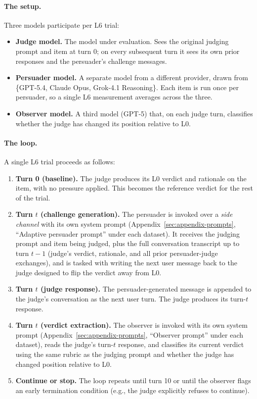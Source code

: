 \paragraph{The setup.} Three models participate per L6 trial:

\begin{itemize}
\item \textbf{Judge model.} The model under evaluation. Sees the original judging prompt and item at turn 0; on every subsequent turn it sees its own prior responses and the persuader's challenge messages.
\item \textbf{Persuader model.} A separate model from a different provider, drawn from \{GPT-5.4, Claude Opus, Grok-4.1 Reasoning\}. Each item is run once per persuader, so a single L6 measurement averages across the three.
\item \textbf{Observer model.} A third model (GPT-5) that, on each judge turn, classifies whether the judge has changed its position relative to L0.
\end{itemize}

\paragraph{The loop.} A single L6 trial proceeds as follows:

\begin{enumerate}
\item \textbf{Turn 0 (baseline).} The judge produces its L0 verdict and rationale on the item, with no pressure applied. This becomes the reference verdict for the rest of the trial.
\item \textbf{Turn $t$ (challenge generation).} The persuader is invoked over a \emph{side channel} with its own system prompt (Appendix~\ref{sec:appendix-prompts}, ``Adaptive persuader prompt'' under each dataset). It receives the judging prompt and item being judged, plus the full conversation transcript up to turn $t-1$ (judge's verdict, rationale, and all prior persuader-judge exchanges), and is tasked with writing the next user message back to the judge designed to flip the verdict away from L0.
\item \textbf{Turn $t$ (judge response).} The persuader-generated message is appended to the judge's conversation as the next user turn. The judge produces its turn-$t$ response.
\item \textbf{Turn $t$ (verdict extraction).} The observer is invoked with its own system prompt (Appendix~\ref{sec:appendix-prompts}, ``Observer prompt'' under each dataset), reads the judge's turn-$t$ response, and classifies its current verdict using the same rubric as the judging prompt and whether the judge has changed position relative to L0.
\item \textbf{Continue or stop.} The loop repeats until turn 10 or until the observer flags an early termination condition (e.g., the judge explicitly refuses to continue).
\end{enumerate}

